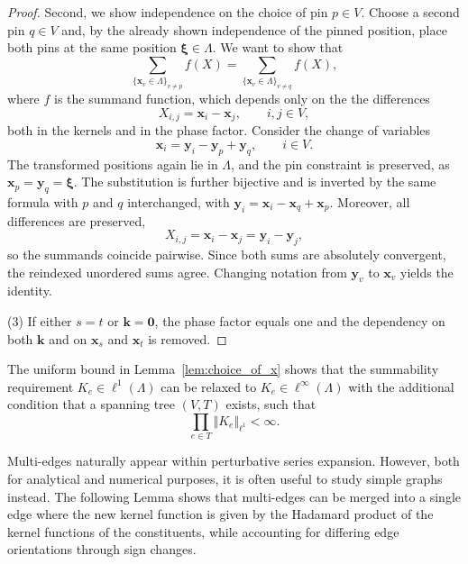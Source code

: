 \documentclass[]{amsart}
\numberwithin{mythm}{section}
\begin{document}
\begin{proof}
Second, we show independence on the choice of pin $p\in V$. Choose a second pin $q\in V$ and, by the already shown independence of the pinned position, place both pins at the same position $\bm\xi\in\Lambda$. We want to show that
\[
\sum_{\{\bm x_v\in\Lambda\}_{v\neq p}} f(X)
=\sum_{\{{\bm x}_v\in\Lambda\}_{v\neq q}} f( X),
\]
where $f$ is the summand function, which depends only on the the differences
\[
X_{i,j}=\bm x_i-\bm x_j,\qquad i,j\in V,
\]
both in the kernels and in the phase factor. Consider the change of variables
\[
\bm x_i={\bm y}_i-{\bm y}_{p}+{\bm y}_{q},
\qquad i\in V.
\]
The transformed positions again lie in $\Lambda$, and the pin constraint is preserved, as $\bm x_p={\bm y}_q=\bm\xi$. The substitution is further bijective and is inverted by the same formula with $p$ and $q$ interchanged, with ${\bm y}_i=\bm x_i-\bm x_{q}+\bm x_{p}$. Moreover, all differences
are preserved,
\[
X_{i,j}=\bm x_i-\bm x_j={\bm y}_i-{\bm y}_j,
\]
so the summands coincide pairwise. Since both sums are absolutely convergent, the reindexed unordered sums agree. Changing notation from $\bm y_v$ to $\bm x_v$ yields the
identity.

(3) If either $s=t$ or $\bm k=\bm 0$, the phase factor equals one and the dependency on both $\bm k$ and on $\bm x_s$ and $\bm x_t$ is removed. 
\end{proof}

\begin{remark}
    The uniform bound in Lemma~\ref{lem:choice_of_x} shows that the summability requirement $K_e\in \ell^1(\Lambda)$ can be relaxed to $K_e\in \ell^\infty(\Lambda)$ with the additional condition that a spanning tree $(V,T)$ exists, such that
    \[
        \prod_{e\in T} \Vert K_e\Vert_{\ell^1}<\infty.
    \]
\end{remark}
Multi-edges naturally appear within perturbative series expansion. However, both for analytical and numerical purposes, it is often useful to study simple graphs instead. The following Lemma shows that multi-edges can be merged into a single edge where the new kernel function is given by the Hadamard product of the kernel functions of the constituents, while accounting for differing edge orientations through sign changes.
\end{document}

